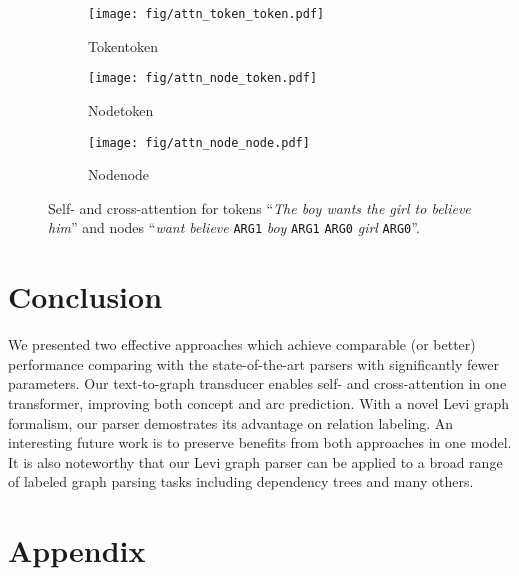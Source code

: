\documentclass[11pt,a4paper]{article}
\begin{document}
\begin{figure}[htbp!]
 \centering
 \begin{subfigure}[b]{0.3\columnwidth}
     \centering
     \texttt{[image: fig/attn\_token\_token.pdf]}
     \caption{Token{\small }token }
     \label{fig:attn-token-token}
 \end{subfigure}
 \hfill
 \begin{subfigure}[b]{0.3\columnwidth}
     \centering
     \texttt{[image: fig/attn\_node\_token.pdf]}
     \caption{Node{\small }token }
     \label{fig:attn-node-token}
 \end{subfigure}
 \hfill
 \begin{subfigure}[b]{0.3\columnwidth}
     \centering
     \texttt{[image: fig/attn\_node\_node.pdf]}
     \caption{Node{\small }node}
     \label{fig:attn-node-node}
 \end{subfigure}
\caption{Self- and cross-attention for tokens ``\textit{The boy wants the girl to believe him}'' and nodes ``\textit{want believe} \texttt{ARG1} \textit{boy} \texttt{ARG1} \texttt{ARG0} \textit{girl} \texttt{ARG0}''.}
\label{fig:attn}
\vspace{-1.5ex}
\end{figure}





	 \section{Conclusion}
\label{sec:conclusion}

We presented two  effective approaches which achieve comparable (or better) performance comparing with the state-of-the-art parsers with significantly fewer parameters. Our text-to-graph transducer enables self- and cross-attention in one transformer, improving both concept and arc prediction. With a novel Levi graph formalism, our parser demostrates its advantage on relation labeling. An interesting future work is to preserve benefits from both approaches in one model. It is also noteworthy that our Levi graph parser can be applied to a broad range of labeled graph parsing tasks including dependency trees and many others. 



\cleardoublepage\appendix
\section{Appendix}
\label{sec:appendix}
\end{document}

